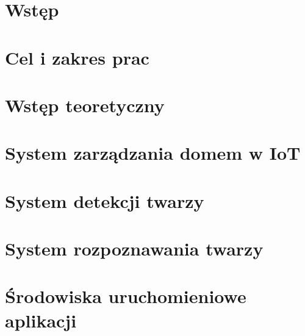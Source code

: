 \documentclass[11pt, a4paper,polish,twoside]{report}
\begin{document}



\newpage
\null
\thispagestyle{empty}
\newpage




\tableofcontents

\chapter{Wstęp}


\chapter{Cel i zakres prac}


\chapter{Wstęp teoretyczny}


\chapter{System zarządzania domem w IoT}


\chapter{System detekcji twarzy} \label{detekcja_twarzy}


\chapter{System rozpoznawania twarzy} \label{rozpoznawanie_twarzy}


\chapter{Środowiska uruchomieniowe aplikacji}
\end{document}
